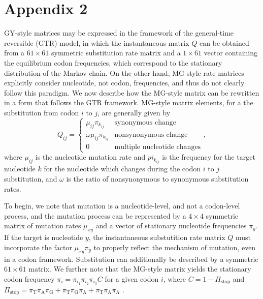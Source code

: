 \documentclass[11pt]{article}
\begin{document}
\section*{Appendix 2}
GY-style matrices may be expressed in the framework of the general-time reversible (GTR) model, in which the instantaneous matrix $Q$ can be obtained from a $61 \times 61$ symmetric substitution rate matrix and a $1\times61$ vector containing the equilibrium codon frequencies, which correspond to the stationary distribution of the Markov chain. On the other hand, MG-style rate matrices explicitly consider nucleotide, not codon, frequencies, and thus do not clearly follow this paradigm. We now describe how the MG-style matrix can be rewritten in a form that follows the GTR framework. 
MG-style matrix elements, for a the substitution from codon $i$ to $j$, are generally given by 
\begin{equation}\label{eq:MGstyle}
Q_{ij} = \left\{ 
\begin{array}{rl}
\mu_{ij}\pi_{k_{ij}}        &\mbox{synonymous change} \\
\omega\mu_{ij}\pi_{k_{ij}}  &\mbox{nonsynonymous change} \\
0                           &\mbox{multiple nucleotide changes}       
\end{array} \right. ,
\end{equation} where $\mu_{ij}$ is the nucleotide mutation rate and $pi_{k_{ij}}$ is the frequency for the target nucleotide $k$ for the nucleotide which changes during the codon $i$ to $j$ substitution, and $\omega$ is the ratio of nonsynonymous to synonymous substitution rates.


To begin, we note that mutation is a nucleotide-level, and not a codon-level process, and the mutation process can be represented by a $4 \times 4$ symmetric matrix of mutation rates $\mu_{xy}$ and a vector of stationary nucleotide frequencies $\pi_y$. If the target is nucleotide $y$, the instantaneous substutition rate matrix $Q$ must incorporate the factor $\mu_{xy}\pi_y$ to properly reflect the mechanism of mutation, even in a codon framework. Substitution can additionally be described by a symmetric $61\times61$ matrix. We further note that the MG-style matrix yields the stationary codon frequency $\pi_i = \pi_{i_1}\pi_{i_2}\pi_{i_3}C$ for a given codon $i$, where $C = 1 - \Pi_\text{stop}$ and $\Pi_\text{stop} = \pi_\text{T}\pi_\text{A}\pi_\text{G} + \pi_\text{T}\pi_\text{G}\pi_\text{A} + \pi_\text{T}\pi_\text{A}\pi_\text{A}$ \cite{MuseGaut1994}. 
\end{document}
